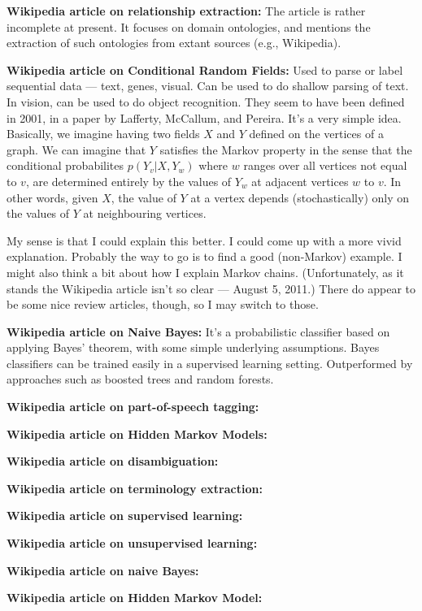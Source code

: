 \textbf{Wikipedia article on relationship extraction:} The article is
rather incomplete at present.  It focuses on domain ontologies, and
mentions the extraction of such ontologies from extant sources (e.g.,
Wikipedia).

\textbf{Wikipedia article on Conditional Random Fields:} Used to parse
or label sequential data --- text, genes, visual.  Can be used to do
shallow parsing of text.  In vision, can be used to do object
recognition.  They seem to have been defined in 2001, in a paper by
Lafferty, McCallum, and Pereira.  It's a very simple idea.  Basically,
we imagine having two fields $X$ and $Y$ defined on the vertices of a
graph.  We can imagine that $Y$ satisfies the Markov property in the
sense that the conditional probabilites $p(Y_v | X, Y_w)$ where $w$
ranges over all vertices not equal to $v$, are determined entirely by
the values of $Y_w$ at adjacent vertices $w$ to $v$.  In other words,
given $X$, the value of $Y$ at a vertex depends (stochastically) only
on the values of $Y$ at neighbouring vertices.

My sense is that I could explain this better.  I could come up with a
more vivid explanation.  Probably the way to go is to find a good
(non-Markov) example.  I might also think a bit about how I explain
Markov chains.  (Unfortunately, as it stands the Wikipedia article
isn't so clear --- August 5, 2011.)  There do appear to be some nice
review articles, though, so I may switch to those.

\textbf{Wikipedia article on Naive Bayes:} It's a probabilistic
classifier based on applying Bayes' theorem, with some simple
underlying assumptions. Bayes classifiers can be trained easily in a
supervised learning setting.  Outperformed by approaches such as
boosted trees and random forests.

\textbf{Wikipedia article on part-of-speech tagging:}

\textbf{Wikipedia article on Hidden Markov Models:}


\textbf{Wikipedia article on disambiguation:}

\textbf{Wikipedia article on terminology extraction:}

\textbf{Wikipedia article on supervised learning:}

\textbf{Wikipedia article on unsupervised learning:}

\textbf{Wikipedia article on naive Bayes:}

\textbf{Wikipedia article on Hidden Markov Model:}



